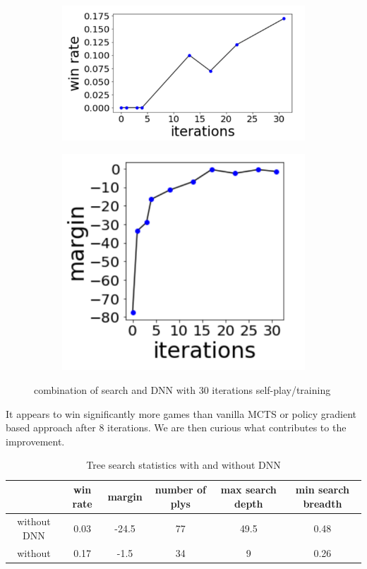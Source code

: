 \documentclass{article}
\begin{document}
\begin{figure}[ht]
\centering
\begin{subfigure}{.5\textwidth}
\centering
\includegraphics[width=0.9\linewidth]{nnguidedwinrate}
\end{subfigure}%
\begin{subfigure}{.5\textwidth}
\centering
\centering
\includegraphics[width=0.9\linewidth]{nnguidedmargin}
\end{subfigure}
\caption{combination of search and DNN with 30 iterations self-play/training}
\label{fig:nnguidedresult}
\end{figure}

It appears to win significantly more games than vanilla MCTS or policy gradient based approach after 8 iterations. We are then curious what contributes to the improvement.


\begin{table}[ht]
  \caption{Tree search statistics with and without DNN}
  \label{tbl:mctsvsnnguided}
  \centering
  \begin{tabular}{c | c | c | c | c | c }
    & win rate  & margin & number of plys & max search depth  & min search breadth \\
    \hline
    without DNN & 0.03 & -24.5  &  77 & 49.5 &  0.48 \\
    without     & 0.17 & -1.5   &  34 &  9   & 0.26 \\
  \end{tabular}
\end{table}
\end{document}
